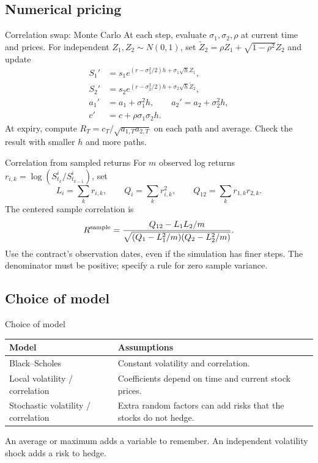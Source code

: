 \documentclass[handout,10pt,t,aspectratio=169]{beamer}
\begin{document}
\subsection{Numerical pricing}


\begin{frame}{Correlation swap: Monte Carlo}
\small
At each step, evaluate \(\sigma_1,\sigma_2,\rho\) at current time and prices.
For independent \(Z_1,Z_2\sim N(0,1)\), set
\(\widetilde Z_2=\rho Z_1+\sqrt{1-\rho^2}Z_2\) and update
\[
 \begin{aligned}
 S_1'&=s_1e^{(r-\sigma_1^2/2)h+\sigma_1\sqrt h Z_1},\\
 S_2'&=s_2e^{(r-\sigma_2^2/2)h+\sigma_2\sqrt h\widetilde Z_2},\\
 a_1'&=a_1+\sigma_1^2h,\qquad a_2'=a_2+\sigma_2^2h,\\
 c'&=c+\rho\sigma_1\sigma_2h.
 \end{aligned}
\]
At expiry, compute \(R_T=c_T/\sqrt{a_{1,T}a_{2,T}}\) on each path and average.
Check the result with smaller \(h\) and more paths.
\end{frame}


\begin{frame}{Correlation from sampled returns}
\small
For \(m\) observed log returns \(r_{i,k}=\log(S^i_{t_k}/S^i_{t_{k-1}})\),
set
\[
 L_i=\sum_k r_{i,k},\qquad Q_i=\sum_k r_{i,k}^2,\qquad
 Q_{12}=\sum_k r_{1,k}r_{2,k}.
\]
The centered sample correlation is
\[
 R^{\rm sample}=\frac{Q_{12}-L_1L_2/m}
 {\sqrt{(Q_1-L_1^2/m)(Q_2-L_2^2/m)}}.
\]
Use the contract's observation dates, even if the simulation has finer steps.
The denominator must be positive; specify a rule for zero sample variance.
\end{frame}


\subsection{Choice of model}

\begin{frame}{Choice of model}
\small
\begin{center}\begin{tabular}{L{.25\textwidth}L{.58\textwidth}}
\toprule Model & Assumptions\\\midrule
Black--Scholes & Constant volatility and correlation.\\[.8em]
Local volatility / correlation & Coefficients depend on time and current stock prices.\\[.8em]
Stochastic volatility / correlation & Extra random factors can add risks that the stocks do not hedge.\\\bottomrule
\end{tabular}\end{center}
An average or maximum adds a variable to remember.
An independent volatility shock adds a risk to hedge.
\end{frame}
\end{document}
